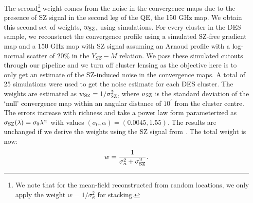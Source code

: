 The second\footnote{We note that for the mean-field reconstructed from random locations, we only apply the weight $w = 1/\sigma_{\kappa}^2$ for stacking.} weight comes from the noise in the convergence maps due to the presence of SZ signal in the second leg of the QE, the \sptpol{} 150 GHz map.
We obtain this second set of weights, $w_{\rm SZ}$, using simulations. 
For every cluster in the DES sample, we reconstruct the convergence profile using a simulated SZ-free gradient map and a 150 GHz map with SZ signal assuming an Arnaud profile \citep{arnaud10} with a log-normal scatter of 20\% in the $Y_{SZ}-M$ relation. 
We pass these simulated cutouts through our pipeline and we turn off cluster lensing as the objective here is to only get an estimate of the SZ-induced noise in the convergence maps.
A total of 25 simulations were used to get the noise estimate for each DES cluster.
The weights are estimated as
$w_{\rm SZ} = 1/\sigma_{\rm SZ}^{2}$, where $\sigma_{\rm SZ}$ is the standard deviation of the `null' convergence map within an angular distance of $10^{\prime}$ from the cluster centre.
The errors increase with richness and take a power law form parameterized as $\sigma_{\rm SZ}(\lambda) =  \sigma_{0}\lambda^{\alpha}$ with values $%
(\sigma_{0}, \alpha) = (0.0045, 1.55)$.
The results are unchanged if we derive the weights using the SZ signal from \cite{sehgal10}.
The total weight is now:
 \begin{equation}
 w = \frac{1}{\sigma_{\kappa}^{2} + \sigma_{\rm SZ}^{2}}.
\label{eq_cluster_weight}
 \end{equation}

